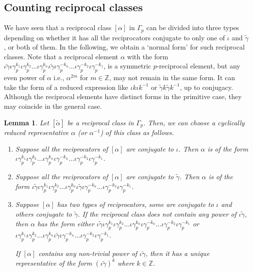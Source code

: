 \documentclass[11pt]{amsart}
\numberwithin{equation}{section}
\newtheorem{lemma}[theorem]{Lemma}
\theoremstyle{definition}
\newcommand{\gt}{\tilde{\gamma}}
\newcommand{\n}{\newline}
\newcommand{\z}{\mathbb{Z}}
\newcommand{\g}{\gamma_{p}}
\newcommand{\io}{\iota }
\numberwithin{equation}{section}
\begin{document}
	\subsection{Counting reciprocal classes}
	We have seen that a reciprocal class $[\alpha]$ in $\Gamma_p$ can be divided into three types depending on whether it has all the reciprocators conjugate to only one of  $\iota$ and  $\gt$, or both of them. In the following, we obtain a `normal form' for such reciprocal classes. 
	Note that a reciprocal element $\alpha$ with the form  $ \io \gt\io \g^{k_{1}}\io \g^{k_{2}}\dots \io \g^{k_{n}}\io \gt\io \g^{-k_{n}}\dots\io \g^{-k_{2}}\io \g^{-k_{1}} $, is a symmetric $p$-reciprocal element, but any even power of $\alpha$ i.e., $\alpha^{2m}$ for  $m\in \z$, may not remain in the same form. It can take the form of a reduced expression like $\io k\io k^{-1}$ or  $\gt k \gt k^{-1}$, up to conjugacy. Although the reciprocal elements have distinct forms in the primitive case, they may coincide in the general case.
	\begin{lemma}\label{lem} Let $[{\tilde{\alpha}}]$ be a reciprocal class in $\Gamma_p$.  Then, we can choose a cyclically reduced representative $\alpha$ (or $\alpha^{-1}$) of this class as follows.  
		
		\begin{enumerate}
			\item Suppose all the reciprocators of $[\alpha]$ are conjugate to $\io$. Then  $\alpha$ is of the form  \\$ \io\g^{k_{1}}\io \g^{k_{2}}\dots \io \g^{k_{n}}\io \g^{-k_{n}}\dots\io \g^{-k_{2}}\io \g^{-k_{1}}  $.
			\item Suppose all the reciprocators of $[\alpha]$ are  conjugate to $ \gt $. Then $\alpha$ is of the form  \n  $ \io \gt\io \g^{k_{1}}\io \g^{k_{2}}\dots \io \g^{k_{n}}\io \gt\io \g^{-k_{n}}\dots\io \g^{-k_{2}}\io \g^{-k_{1}} $.
			\item Suppose  $[\alpha]$ has two types of reciprocators, some are conjugate to  $ \io $ and others conjugate to $ \gt $. 
			If the reciprocal class does not contain any power of $\io \gt$,   then $\alpha$ has the form  either \n
			$ \io\gt\io  \g^{k_{1}}\io \g^{k_{2}}\dots \io \g^{k_{n}}\io \g^{-k_{n}}\dots\io \g^{-k_{2}}\io \g^{-k_{1}} $ or $\io  \g^{k_{1}}\io \g^{k_{2}}\dots \io \g^{k_{n}}\io\gt\io \g^{-k_{n}}\dots\io \g^{-k_{2}}\io \g^{-k_{1}}$.
			
			
			If $[\alpha]$ contains any non-trivial power of $\io \gt  $, then it has a unique representative of the form $ (\io\gt )^{k}$ where $ k\in \z$. 
	\end{enumerate}\end{lemma}
\end{document}
